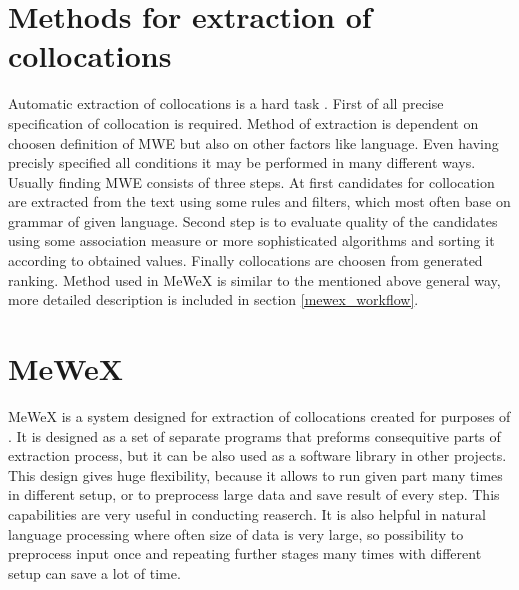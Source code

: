 \section{Methods for extraction of collocations} \label{extraction_method}
Automatic extraction of collocations is a hard task \cite{ramisch}. First of all precise specification of collocation is required.
Method of extraction is dependent on choosen definition of MWE but also on other factors like language. 
Even having precisly specified all conditions it may be performed in many different ways. 
Usually finding MWE consists of three steps. At first candidates for collocation are extracted from the text using some rules and filters, 
which most often base on grammar of given language. Second step is to evaluate quality of the candidates 
using some association measure or more sophisticated algorithms and sorting it according to obtained values. 
Finally collocations are choosen from generated ranking. Method used in MeWeX is similar to the mentioned above general way, 
more detailed description is included in section \ref{mewex_workflow}.

\section{MeWeX}
MeWeX is a system designed for extraction of collocations created for purposes of \cite{mgr}. It is designed as a set of separate programs 
that preforms consequitive parts of extraction process, but it can be also used as a software library in other projects. 
This design gives huge flexibility, because it allows to run given part many times in different setup, 
or to preprocess large data and save result of every step. This capabilities are very useful in conducting reaserch. 
It is also helpful in natural language processing where often size of data is very large, so possibility 
to preprocess input once and repeating further stages many times with different setup can save a lot of time.

